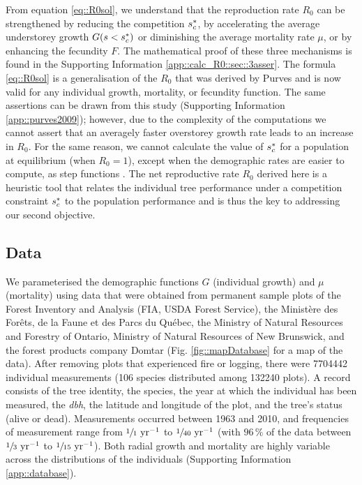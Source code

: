 From equation \eqref{eq::R0sol}, we understand that the reproduction rate $ R_0 $ can be strengthened by reducing the competition $ {s}^{*}_c $, by accelerating the average understorey growth $ G(s < {s}^{*}_c) $ or diminishing the average mortality rate $ \mu $, or by enhancing the fecundity $ F $. The mathematical proof of these three mechanisms is found in the Supporting Information \ref{app::calc_R0::sec::3asser}. The formula \eqref{eq::R0sol} is a generalisation of the $ R_0 $ that was derived by Purves and is now valid for any individual growth, mortality, or fecundity function. The same assertions can be drawn from this study (Supporting Information \ref{app::purves2009}); however, due to the complexity of the computations we cannot assert that an averagely faster overstorey growth rate leads to an increase in $ R_0 $. For the same reason, we cannot calculate the value of $ {s}^{*}_c $ for a population at equilibrium (\ie when $ R_0 = 1 $), except when the demographic rates are easier to compute, as step functions \citep[Supporting Information \ref{app::purves2009} for the proof]{Purves2009}. The net reproductive rate $ R_0 $ derived here is a heuristic tool that relates the individual tree performance under a competition constraint $ {s}^{*}_c $ to the population performance and is thus the key to addressing our second objective.

\subsection{Data}
We parameterised the demographic functions $ G $ (individual growth) and $ \mu $ (mortality) using data that were obtained from permanent sample plots of the Forest Inventory and Analysis (FIA, USDA Forest Service), the Ministère des Forêts, de la Faune et des Parcs du Québec, the Ministry of Natural Resources and Forestry of Ontario, Ministry of Natural Resources of New Brunswick, and the forest products company Domtar (Fig. \ref{fig::mapDatabase} for a map of the data). After removing plots that experienced fire or logging, there were \num{7704442} individual measurements (106 species distributed among \num{132240} plots). A record consists of the tree identity, the species, the year at which the individual has been measured, the \textit{dbh}, the latitude and longitude of the plot, and the tree's status (alive or dead). Measurements occurred between 1963 and 2010, and frequencies of measurement range from $ \sfrac{1}{1} \text{ yr}^{-1} $ to $ \sfrac{1}{40} \text{ yr}^{-1} $ (with $ 96 \, \% $ of the data between $ \sfrac{1}{3} \text{ yr}^{-1} $ to $ \sfrac{1}{15} \text{ yr}^{-1} $). Both radial growth and mortality are highly variable across the distributions of the individuals (Supporting Information \ref{app::database}).

